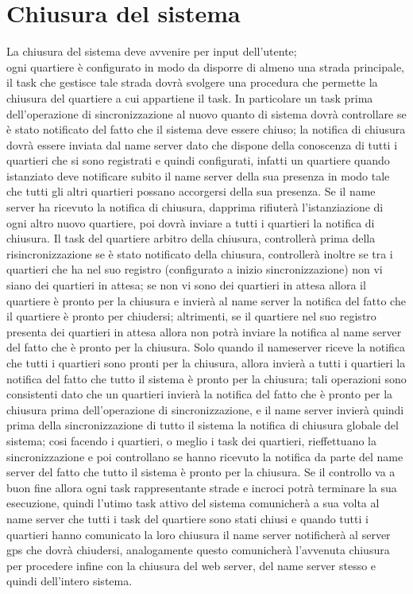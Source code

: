 \section{Chiusura del sistema}
La chiusura del sistema deve avvenire per input dell'utente;\\
ogni quartiere è configurato in modo da disporre di almeno una strada principale, il task che gestisce tale strada dovrà svolgere una procedura che permette la chiusura del quartiere a cui appartiene il task. In particolare un task prima dell'operazione di sincronizzazione al nuovo quanto di sistema dovrà controllare se è stato notificato del fatto che il sistema deve essere chiuso; la notifica di chiusura dovrà essere inviata dal name server dato che dispone della conoscenza di tutti i quartieri che si sono registrati e quindi configurati, infatti un quartiere quando istanziato deve notificare subito il name server della sua presenza in modo tale che tutti gli altri quartieri possano accorgersi della sua presenza. Se il name server ha ricevuto la notifica di chiusura, dapprima rifiuterà l'istanziazione di ogni altro nuovo quartiere, poi dovrà inviare a tutti i quartieri la notifica di chiusura. Il task del quartiere arbitro della chiusura, controllerà prima della risincronizzazione se è stato notificato della chiusura, controllerà inoltre se tra i quartieri che ha nel suo registro (configurato a inizio sincronizzazione) non vi siano dei quartieri in attesa; se non vi sono dei quartieri in attesa allora il quartiere è pronto per la chiusura e invierà al name server la notifica del fatto che il quartiere è pronto per chiudersi; altrimenti, se il quartiere nel suo registro presenta dei quartieri in attesa allora non potrà inviare la notifica al name server del fatto che è pronto per la chiusura. Solo  quando il nameserver riceve la notifica che tutti i quartieri sono pronti per la chiusura, allora invierà a tutti i quartieri la notifica del fatto che tutto il sistema è pronto per la chiusura; tali operazioni sono consistenti dato che un quartieri invierà la notifica del fatto che è pronto per la chiusura prima dell'operazione di sincronizzazione, e il name server invierà quindi prima della sincronizzazione di tutto il sistema la notifica di chiusura globale del sistema; cosi facendo i quartieri, o meglio i task dei quartieri, rieffettuano la sincronizzazione e poi controllano se hanno ricevuto la notifica da parte del name server del fatto che tutto il sistema è pronto per la chiusura. Se il controllo va a buon fine allora ogni task rappresentante strade e incroci potrà terminare la sua esecuzione, quindi l'utimo task attivo del sistema comunicherà a sua volta al name server che tutti i task del quartiere sono stati chiusi e quando tutti i quartieri hanno comunicato la loro chiusura il name server notificherà al server gps che dovrà chiudersi, analogamente questo comunicherà l'avvenuta chiusura per procedere infine con la chiusura del web server, del name server stesso e quindi dell'intero sistema.